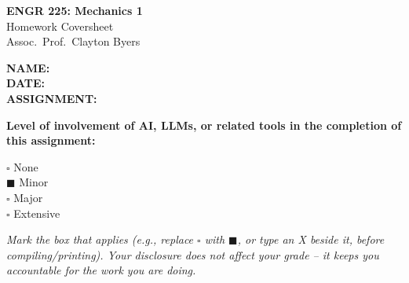 \documentclass[11pt]{article}
\newcommand{\assignmentNumber}{8}
\newcommand{\assignedDate}{8 Nov 2024}
\newcommand{\dueDate}{15 Nov 2024 (11:59pm on Moodle)}
\begin{document}
\begin{titlepage}
    \centering
    \vspace*{2cm}
    {\LARGE \bfseries ENGR 225: Mechanics 1} \\[0.3cm]
    {\Large Homework Coversheet} \\[0.3cm]
    {\large Assoc.\ Prof.\ Clayton Byers} \\[2cm]

    \begin{flushleft}
        \Large
        \textbf{NAME:} \underline{} \\[1cm]
        \textbf{DATE:} \underline{\makebox[10cm][l]{\ }} \\[1cm]
        \textbf{ASSIGNMENT:} \underline{} \\[2cm]
    \end{flushleft}

    \large
    \textbf{Level of involvement of AI, LLMs, or related tools in the completion of this assignment:}

    \vspace{1cm}

    \begin{flushleft}
        \Large
        $\square$ \quad None \\[0.7cm]
        $\blacksquare$ \quad Minor \\[0.7cm]
        $\square$ \quad Major \\[0.7cm]
        $\square$ \quad Extensive \\[1.5cm]
    \end{flushleft}

    \normalsize
    \textit{Mark the box that applies (e.g., replace $\square$ with $\blacksquare$, or type an X beside it, before compiling/printing). Your disclosure does not affect your grade -- it keeps you accountable for the work you are doing.}
\end{titlepage}

\end{document}
